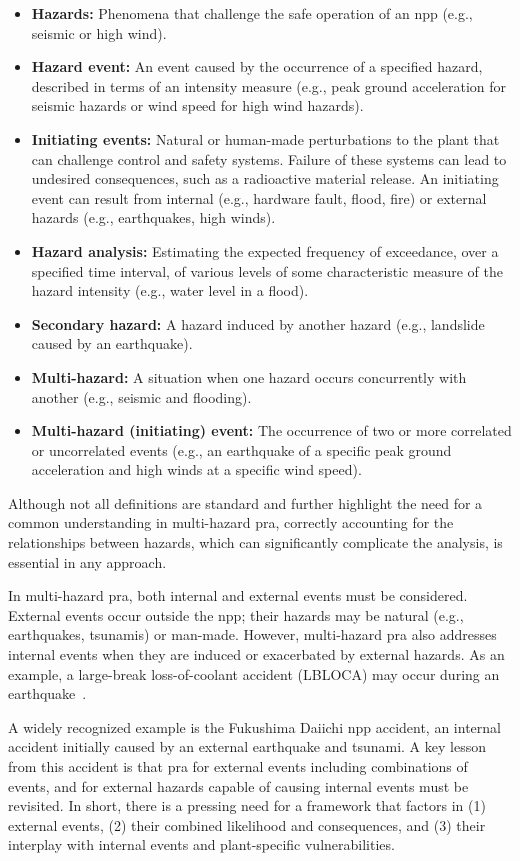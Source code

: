 \begin{itemize}
\item \textbf{Hazards:} Phenomena that challenge the safe operation of an \acrshort{npp} (e.g., seismic or high wind).
\item \textbf{Hazard event:} An event caused by the occurrence of a specified hazard, described in terms of an intensity measure (e.g., peak ground acceleration for seismic hazards or wind speed for high wind hazards).
\item \textbf{Initiating events:} Natural or human-made perturbations to the plant that can challenge control and safety systems. Failure of these systems can lead to undesired consequences, such as a radioactive material release. An initiating event can result from internal (e.g., hardware fault, flood, fire) or external hazards (e.g., earthquakes, high winds).
\item \textbf{Hazard analysis:} Estimating the expected frequency of exceedance, over a specified time interval, of various levels of some characteristic measure of the hazard intensity (e.g., water level in a flood).
\item \textbf{Secondary hazard:} A hazard induced by another hazard (e.g., landslide caused by an earthquake).
\item \textbf{Multi-hazard:} A situation when one hazard occurs concurrently with another (e.g., seismic and flooding).
\item \textbf{Multi-hazard (initiating) event:} The occurrence of two or more correlated or uncorrelated events (e.g., an earthquake of a specific peak ground acceleration and high winds at a specific wind speed).
\end{itemize}

Although not all definitions are standard and further highlight the need for a common understanding in multi-hazard \acrshort{pra}, correctly accounting for the relationships between hazards, which can significantly complicate the analysis, is essential in any approach.

In multi-hazard \acrshort{pra}, both internal and external events must be considered. External events occur outside the \acrshort{npp}; their hazards may be natural (e.g., earthquakes, tsunamis) or man-made. However, multi-hazard \acrshort{pra} also addresses internal events when they are induced or exacerbated by external hazards. As an example, a large-break loss-of-coolant accident (LBLOCA) may occur during an earthquake~\cite{Yu2015Large}.

A widely recognized example is the Fukushima Daiichi \acrshort{npp} accident, an internal accident initially caused by an external earthquake and tsunami. A key lesson from this accident is that \acrshort{pra} for external events including combinations of events, and for external hazards capable of causing internal events must be revisited. In short, there is a pressing need for a framework that factors in (1) external events, (2) their combined likelihood and consequences, and (3) their interplay with internal events and plant-specific vulnerabilities.

